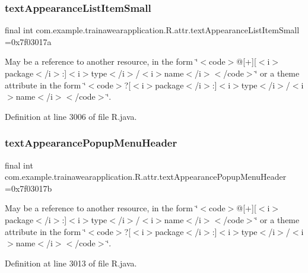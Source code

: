 \subsubsection{\texorpdfstring{textAppearanceListItemSmall}{textAppearanceListItemSmall}}
{\footnotesize\ttfamily final int com.\+example.\+trainawearapplication.\+R.\+attr.\+text\+Appearance\+List\+Item\+Small =0x7f03017a\hspace{0.3cm}{\ttfamily [static]}}

May be a reference to another resource, in the form \char`\"{}$<$code$>$@\mbox{[}+\mbox{]}\mbox{[}$<$i$>$package$<$/i$>$\+:\mbox{]}$<$i$>$type$<$/i$>$/$<$i$>$name$<$/i$>$$<$/code$>$\char`\"{} or a theme attribute in the form \char`\"{}$<$code$>$?\mbox{[}$<$i$>$package$<$/i$>$\+:\mbox{]}$<$i$>$type$<$/i$>$/$<$i$>$name$<$/i$>$$<$/code$>$\char`\"{}. 

Definition at line 3006 of file R.\+java.

\mbox{\label{classcom_1_1example_1_1trainawearapplication_1_1_r_1_1attr_ab34a959b991c47f631240841e55d64af}} 
\subsubsection{\texorpdfstring{textAppearancePopupMenuHeader}{textAppearancePopupMenuHeader}}
{\footnotesize\ttfamily final int com.\+example.\+trainawearapplication.\+R.\+attr.\+text\+Appearance\+Popup\+Menu\+Header =0x7f03017b\hspace{0.3cm}{\ttfamily [static]}}

May be a reference to another resource, in the form \char`\"{}$<$code$>$@\mbox{[}+\mbox{]}\mbox{[}$<$i$>$package$<$/i$>$\+:\mbox{]}$<$i$>$type$<$/i$>$/$<$i$>$name$<$/i$>$$<$/code$>$\char`\"{} or a theme attribute in the form \char`\"{}$<$code$>$?\mbox{[}$<$i$>$package$<$/i$>$\+:\mbox{]}$<$i$>$type$<$/i$>$/$<$i$>$name$<$/i$>$$<$/code$>$\char`\"{}. 

Definition at line 3013 of file R.\+java.

\mbox{\label{classcom_1_1example_1_1trainawearapplication_1_1_r_1_1attr_a7c5f9c532f87a44728789777e362cddf}} 
